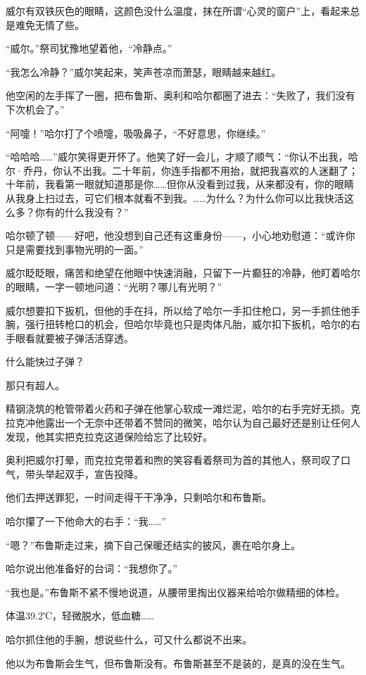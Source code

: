 \documentclass[../main]{subfiles}
\begin{document}
威尔有双铁灰色的眼睛，这颜色没什么温度，抹在所谓“心灵的窗户”上，看起来总是难免无情了些。

“威尔。”祭司犹豫地望着他，“冷静点。”

“我怎么冷静？”威尔笑起来，笑声苍凉而萧瑟，眼睛越来越红。

他空闲的左手挥了一圈，把布鲁斯、奥利和哈尔都圈了进去：“失败了，我们没有下次机会了。”

“阿嚏！”哈尔打了个喷嚏，吸吸鼻子，“不好意思，你继续。”

“哈哈哈……”威尔笑得更开怀了。他笑了好一会儿，才顺了顺气：“你认不出我，哈尔·乔丹，你认不出我。二十年前，你连手指都不用抬，就把我喜欢的人迷翻了；十年前，我看第一眼就知道那是你……但你从没看到过我，从来都没有，你的眼睛从我身上扫过去，可它们根本就看不到我。……为什么？为什么你可以比我快活这么多？你有的什么我没有？”

哈尔顿了顿——好吧，他没想到自己还有这重身份——，小心地劝慰道：“或许你只是需要找到事物光明的一面。”

威尔眨眨眼，痛苦和绝望在他眼中快速消融，只留下一片癫狂的冷静，他盯着哈尔的眼睛，一字一顿地问道：“光明？哪儿有光明？”

威尔想要扣下扳机，但他的手在抖，所以给了哈尔一手扣住枪口，另一手抓住他手腕，强行扭转枪口的机会，但哈尔毕竟也只是肉体凡胎，威尔扣下扳机，哈尔的右手眼看就要被子弹活活穿透。

什么能快过子弹？

那只有超人。

精钢浇筑的枪管带着火药和子弹在他掌心软成一滩烂泥，哈尔的右手完好无损。克拉克冲他露出一个无奈中还带着不赞同的微笑，哈尔认为自己最好还是别让任何人发现，他其实把克拉克这道保险给忘了比较好。

奥利把威尔打晕，而克拉克带着和煦的笑容看着祭司为首的其他人，祭司叹了口气，带头举起双手，宣告投降。

他们去押送罪犯，一时间走得干干净净，只剩哈尔和布鲁斯。

哈尔攥了一下他命大的右手：“我……”

“嗯？”布鲁斯走过来，摘下自己保暖还结实的披风，裹在哈尔身上。

哈尔说出他准备好的台词：“我想你了。”

“我也是。”布鲁斯不紧不慢地说道，从腰带里掏出仪器来给哈尔做精细的体检。

体温39.2℃，轻微脱水，低血糖……

哈尔抓住他的手腕，想说些什么，可又什么都说不出来。

他以为布鲁斯会生气，但布鲁斯没有。布鲁斯甚至不是装的，是真的没在生气。
\end{document}
